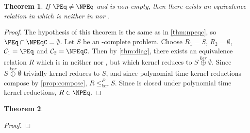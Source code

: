 \documentclass{article}
\newtheorem{theorem}{Theorem}[section]
\theoremstyle{definition} \newtheorem{definition}[definition]{Definition}
\newcommand{\kj}{\overset{ker}{\oplus}} %
\newcommand{\kr}{\leq^{P}_{ker}} %
\begin{document}
\begin{theorem}
  If $\PEq\neq\NPEq$ and \NPEqC is non-empty, then there exists an equivalence
  relation in \NPEq which is neither in \PEq nor \NPEqC.
\end{theorem}
\begin{proof}
  The hypothesis of this theorem is the same as in \autoref{thm:npeqc}, so
  $\PEq\cap\NPEqC=\emptyset$. Let $S$ be an \NPEq-complete problem. Choose
  $R_1=S$, $R_2=\emptyset$, $\mathcal{C}_1=\PEq$ and
  $\mathcal{C}_2=\NPEqC$. Then by \autoref{thm:diag}, there exists an
  equivalence relation $R$ which is in neither \NPEqC nor \PEq, but which
  kernel reduces to $S\kj\emptyset$. Since $S\kj\emptyset$ trivially kernel
  reduces to $S$, and since polynomial time kernel reductions compose by
  \autoref{prop:compose}, $R\kr S$. Since \NPEq is closed under polynomial time
  kernel reductions, $R\in\NPEq$.
\end{proof}

\begin{theorem}
\end{theorem}
\begin{proof}
\end{proof}

 
\end{document}
